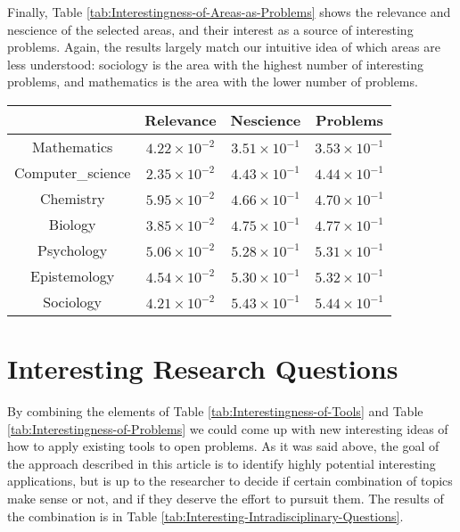 Finally, Table \ref{tab:Interestingness-of-Areas-as-Problems} shows
the relevance and nescience of the selected areas, and their interest
as a source of interesting problems. Again, the results largely match
our intuitive idea of which areas are less understood: sociology is
the area with the highest number of interesting problems, and mathematics
is the area with the lower number of problems.

\begin{table*}
\begin{centering}
\begin{tabular}{|c|c|c|c|}
\hline 
 & Relevance & Nescience & Problems\tabularnewline
\hline 
\hline 
Mathematics & $4.22\times10^{-2}$ & $3.51\times10^{-1}$ & $3.53\times10^{-1}$\tabularnewline
\hline 
Computer\_science & $2.35\times10^{-2}$ & $4.43\times10^{-1}$ & $4.44\times10^{-1}$\tabularnewline
\hline 
Chemistry & $5.95\times10^{-2}$ & $4.66\times10^{-1}$ & $4.70\times10^{-1}$\tabularnewline
\hline 
Biology & $3.85\times10^{-2}$ & $4.75\times10^{-1}$ & $4.77\times10^{-1}$\tabularnewline
\hline 
Psychology & $5.06\times10^{-2}$ & $5.28\times10^{-1}$ & $5.31\times10^{-1}$\tabularnewline
\hline 
Epistemology & $4.54\times10^{-2}$ & $5.30\times10^{-1}$ & $5.32\times10^{-1}$\tabularnewline
\hline 
Sociology & $4.21\times10^{-2}$ & $5.43\times10^{-1}$ & $5.44\times10^{-1}$\tabularnewline
\hline 
\end{tabular}
\par\end{centering}

\caption{\label{tab:Interestingness-of-Areas-as-Problems}Interestingness of
Areas as Problems}
\end{table*}


%
%

\section{Interesting Research Questions}

By combining the elements of Table \ref{tab:Interestingness-of-Tools}
and Table \ref{tab:Interestingness-of-Problems} we could come up
with new interesting ideas of how to apply existing tools to open
problems. As it was said above, the goal of the approach described
in this article is to identify highly potential interesting applications,
but is up to the researcher to decide if certain combination of topics
make sense or not, and if they deserve the effort to pursuit them.
The results of the combination is in Table \ref{tab:Interesting-Intradisciplinary-Questions}.


